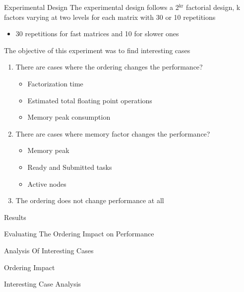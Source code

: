 \documentclass[presentation]{beamer}
\begin{document}
\begin{frame}[label={sec:org1898a0c}]{Experimental Design}
\vfill
The experimental design follows a \alert{2\(^{\text{kr}}\)} factorial design, \alert{k factors}
varying at \alert{two levels} for each matrix with \alert{30 or 10 repetitions}
\begin{itemize}
\item 30 repetitions for fast matrices and 10 for slower ones
\end{itemize}
\vfill
The objective of this experiment was to find \alert{interesting cases}
\begin{enumerate}
\item There are cases where the ordering changes the performance?
\begin{itemize}
\item Factorization time
\item Estimated total floating point operations
\item Memory peak consumption
\end{itemize}
\item There are cases where memory factor changes the performance?
\begin{itemize}
\item Memory peak
\item Ready and Submitted tasks
\item Active nodes
\end{itemize}
\item The ordering does not change performance at all
\end{enumerate}


\vfill
\end{frame}
\begin{frame}[label={sec:org7b38ff4}]{}
\begin{center}
\Huge{Results}
\end{center}
\end{frame}
\begin{frame}[label={sec:orga503c53}]{Evaluating The Ordering Impact on Performance}
\end{frame}
\begin{frame}[label={sec:orge83a529}]{Analysis Of Interesting Cases}
\end{frame}
\begin{frame}[label={sec:org4d8e86e}]{Ordering Impact}
\end{frame}
\begin{frame}[label={sec:org003c168}]{Interesting Case Analysis}
\end{frame}
\end{document}
